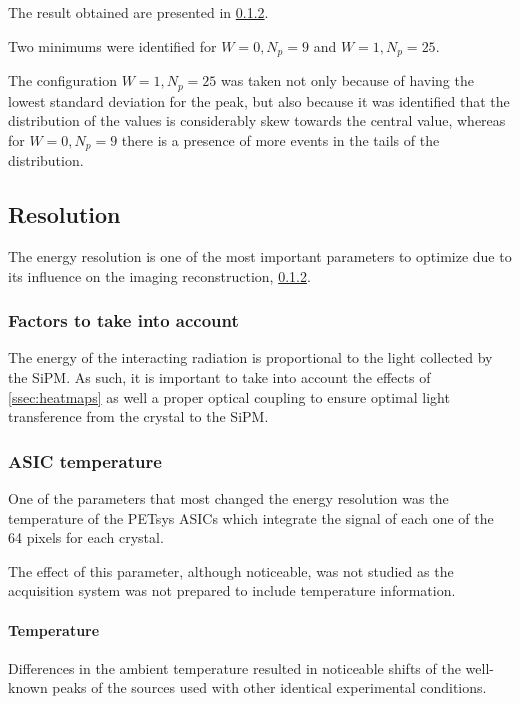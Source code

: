 The result obtained are presented in \ref{}.

Two minimums were identified for $W=0, N_p=9$ and $W=1, N_p=25$.

The configuration $W=1, N_p=25$ was taken not only because of having the lowest standard deviation for the peak, but also because it was identified that the distribution of the values is considerably skew towards the central value, whereas for $W=0, N_p=9$ there is a presence of more events in the tails of the distribution.

\subsection{Resolution}

The energy resolution is one of the most important parameters to optimize due to its influence on the imaging reconstruction, \ref{}.

\subsubsection{Factors to take into account}

The energy of the interacting radiation is proportional to the light collected by the \ac{SiPM}. As such, it is important to take into account the effects of \ref{ssec:heatmaps} as well a proper optical coupling to ensure optimal light transference from the crystal to the \ac{SiPM}.

\subsubsection{ASIC temperature}

One of the parameters that most changed the energy resolution was the temperature of the PETsys \ac{ASIC}s which integrate the signal of each one of the 64 pixels for each crystal.

The effect of this parameter, although noticeable, was not studied as the acquisition system was not prepared to include temperature information.

\paragraph*{Temperature}

Differences in the ambient temperature resulted in noticeable shifts of the well-known peaks of the sources used with other identical experimental conditions.

